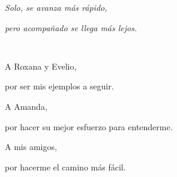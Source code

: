 \hfill\textit{ Solo, se avanza más rápido,}

\hfill\textit{pero acompañado se llega más lejos.}

\begin{verbatim}
    
\end{verbatim}

\hfill A Roxana y Evelio,

\hfill por ser mis ejemplos a seguir.

\hfill A Amanda,

\hfill por hacer su mejor esfuerzo para entenderme.

\hfill A mis amigos,

\hfill por hacerme el camino más fácil.